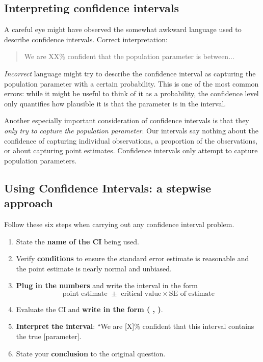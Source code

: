 \subsection{Interpreting confidence intervals}
\label{interpretingCIs}


A careful eye might have observed the somewhat awkward language used to describe confidence intervals. Correct interpretation:
\begin{quote}
We are XX\% confident that the population parameter is between...
\end{quote}
\emph{Incorrect} language might try to describe the confidence interval as capturing the population parameter with a certain probability. This is one of the most common errors: while it might be useful to think of it as a probability, the confidence level only quantifies how plausible it is that the parameter is in the interval.

Another especially important consideration of confidence intervals is that they \emph{only try to capture the population parameter}. Our intervals say nothing about the confidence of capturing individual observations, a proportion of the observations, or about capturing point estimates. Confidence intervals only attempt to capture population parameters.


\subsection{Using Confidence Intervals: a stepwise approach}

Follow these six steps when carrying out any confidence interval problem. 

\begin{termBox}{
\begin{enumerate}
\setlength{\itemsep}{0mm}
\item State the \textbf{name of the CI} being used.
\item Verify \textbf{conditions} to ensure the standard error estimate is reasonable and the point estimate is nearly normal and unbiased.
\item \textbf{Plug in the numbers} and write the interval in the form
$$\text{point estimate } \pm \text{ critical value}\times \text{SE of estimate}$$
\item Evaluate the CI and \textbf{write in the form (  ,  )}.
\item \textbf{Interpret the interval}:  ``We are [X]\% confident that this interval contains the true [parameter].
\item State your \textbf{conclusion} to the original question.
\end{enumerate}}
\end{termBox}

